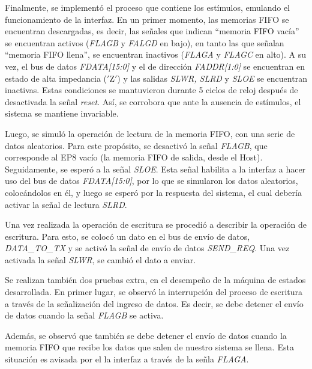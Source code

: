 Finalmente, se implementó el proceso que contiene los estímulos, emulando el funcionamiento de la interfaz. En un primer momento, las memorias FIFO se encuentran descargadas, es decir, las señales que indican ``memoria FIFO vacía'' se encuentran activos ({\it FLAGB} y {\it FALGD} en bajo), en tanto las que señalan ``memoria FIFO llena'', se encuentran inactivos ({\it FLAGA} y {\it FLAGC} en alto).
A su vez, el bus de datos {\it FDATA[15:0]} y el de dirección {\it FADDR[1:0]} se encuentran en estado de alta impedancia ($'$Z$'$) y las salidas {\it SLWR, SLRD} y {\it SLOE} se encuentran inactivas. Estas condiciones se mantuvieron durante 5 ciclos de reloj después de desactivada la señal \textit{reset}. Así, se corrobora que ante la ausencia de estímulos, el sistema se mantiene invariable.

Luego, se simuló la operación de lectura de la memoria FIFO, con una serie de datos aleatorios. Para este propósito, se desactivó la señal {\it FLAGB}, que corresponde al EP8 vacío (la memoria FIFO de salida, desde el Host). Seguidamente, se esperó a la señal {\it SLOE}. Esta señal habilita a la interfaz a hacer uso del bus de datos {\it FDATA[15:0]}, por lo que se simularon los datos aleatorios, colocándolos en él, y luego se esperó por la respuesta del sistema, el cual debería activar la señal de lectura {\it SLRD}.

Una vez realizada la operación de escritura se procedió a describir la operación de escritura. Para esto, se colocó un dato en el bus de envío de datos, {\it DATA\_TO\_TX} y se activó la señal de envío de datos {\it SEND\_REQ}. Una vez activada la señal {\it SLWR}, se cambió el dato a enviar.

Se realizan también dos pruebas extra, en el desempeño de la máquina de estados desarrollada. En primer lugar, se observó la interrupción del proceso de escritura a través de la señalización del ingreso de datos. Es decir, se debe detener el envío de datos cuando la señal {\it FLAGB} se activa.

Además, se observó que también se debe detener el envío de datos cuando la memoria FIFO que recibe los datos que salen de nuestro sistema se llena. Esta situación es avisada por el la interfaz a través de la señla {\it FLAGA}.

